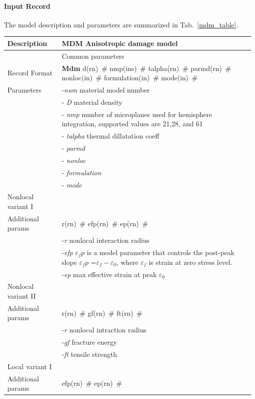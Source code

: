 \documentclass[a4paper]{article}
\newcommand{\descitem}[1]{{\noindent \bf #1}}
\newcommand{\elemparam}[2]{{{#1\tiny (#2)}~\#}}
\newcommand{\param}[1]{{\it #1}}
\newenvironment{mmt}{\begin{tabular}{|l|p{9cm}|}}{\end{tabular}\\}
\newenvironment{mmt}{\begin{tabular}{|l|l|}}{\end{tabular}\\}
\begin{document}
\paragraph{Input Record}
The model description and parameters are summarized
in Tab.~\ref{mdm_table}.

\begin{table}[!htb]
\begin{mmt}
\hline
Description & MDM Anisotropic damage model\\
\hline
& Common parameters\\
Record Format & \descitem{Mdm} \elemparam{d}{rn} \elemparam{nmp}{ins} \elemparam{talpha}{rn}
\elemparam{parmd}{rn}  \elemparam{nonloc}{in}
\elemparam{formulation}{in} \elemparam{mode}{in}\\
Parameters & -\param{num} material model number\\
& - \param{D} material density\\
& - \param{nmp} number of microplanes used for hemisphere integration,
supported values are 21,28, and 61\\
& - \param{talpha}  thermal dillatation coeff\\
& - \param{parmd} \\
& - \param{nonloc} \\
& - \param{formulation}\\
& - \param{mode}\\
\hline
Nonlocal variant I&\\
Additional params &\elemparam{r}{rn} \elemparam{efp}{rn}
\elemparam{ep}{rn} \\
& -\param{r} nonlocal interaction radius\\
& -\param{efp} $\varepsilon_fp$ is a model parameter that controls
the post-peak slope $\varepsilon_fp$ =$\varepsilon_f-\varepsilon_0$,
where $\varepsilon_f$ is strain at zero stress level.\\
& -\param{ep} max effective strain at peak $\varepsilon_0$\\
\hline
Nonlocal variant II&\\
Additional params &\elemparam{r}{rn} \elemparam{gf}{rn}
\elemparam{ft}{rn}\\
& -\param{r} nonlocal intraction radius\\
& -\param{gf} fracture energy\\
& -\param{ft} tensile strength\\
\hline
Local variant I&\\
Additional params &\elemparam{efp}{rn} \elemparam{ep}{rn}\\

\end{mmt}
\end{table}
\end{document}
